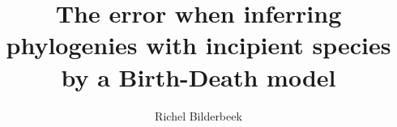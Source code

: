 \documentclass{article}
\title{The error when inferring phylogenies with incipient species by a Birth-Death model}
\author{Richel Bilderbeek}
\begin{document}
\maketitle

\begin{abstract}
  
\end{abstract}














\appendix





\listoftodos
\end{document}

